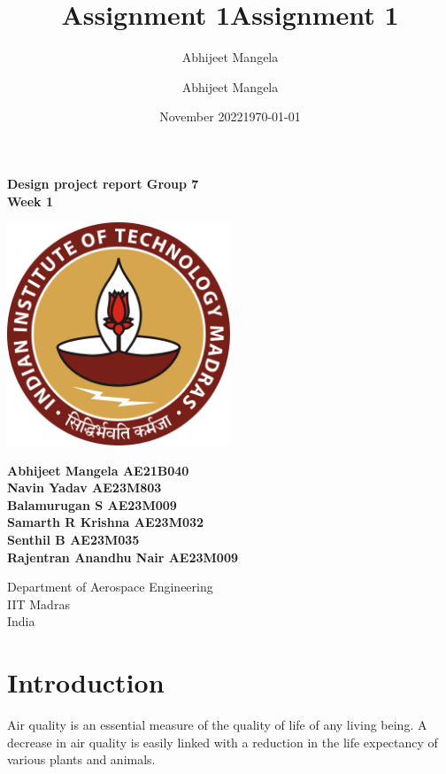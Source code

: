 \documentclass{article}
\title{Assignment 1}
\author{Abhijeet Mangela}
\date{November 2022}
\title{Assignment 1}
\author{Abhijeet Mangela}
\date{\today}
\begin{document}
\begin{titlepage}
\begin{center}

\textbf{\huge Design project report Group 7 \\ \vspace{0.4 cm} Week 1} \\

\vspace{2 cm}

\centering
\includegraphics[width=0.5\textwidth]{IIT_Madras_Logo.svg.png}
\label{fig:my_label}

\vspace{1cm}

\textbf{Abhijeet Mangela AE21B040 \\ Navin Yadav AE23M803 \\ Balamurugan S AE23M009 \\ Samarth R Krishna AE23M032 \\ Senthil B AE23M035 \\ Rajentran Anandhu Nair AE23M009 }

\vspace{0.5cm}

\footnotesize Department of Aerospace Engineering \\
IIT Madras \\
India

\normalsize

\end{center}
\end{titlepage}


\newpage

\tableofcontents

\newpage

\section{Introduction}
Air quality is an essential measure of the quality of life of any living being. A decrease in air quality is easily linked with a reduction in the life expectancy of various plants and animals.
\end{document}
